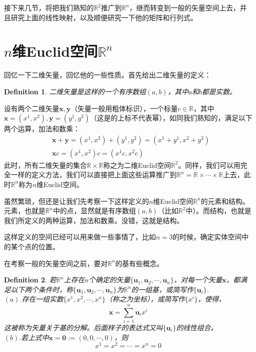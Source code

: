 \documentclass[11pt,a4paper,openany]{book}%
\theoremstyle{plain}%
\newtheorem{defi}{Definition}[chapter]%
\begin{document}
接下来几节，将把我们熟知的$\mathbb{R}^{2}$推广到$\mathbb{R}^{n}$，继而转变到一般的矢量空间上去，并且研究上面的线性映射，以及顺便研究一下他的矩阵和行列式。
\section{$n$维Euclid空间$\mathbb{R}^{n}$}
回忆一下二维矢量，回忆他的一些性质。首先给出二维矢量的定义：
\begin{defi}
二维矢量是这样的一个有序数组$(a,b)$，其中$a$和$b$都是实数。
\end{defi}

设有两个二维矢量$\bm{x},\bm{y}$（矢量一般用粗体标识），一个标量$c \in \mathbb{R}$，其中$\bm{x}=(x^{1},x^{2}),\bm{y}=(y^{1},y^{2})$（这是的上标不代表幂），如同我们熟知的，满足以下两个运算，加法和数乘：
\begin{equation*}
\begin{split}
&\bm{x}+\bm{y}=(x^{1},x^{2})+(y^{1},y^{2})=(x^{1}+y^{1},x^{2}+y^{2})\\
&\bm{x}c=(x^{1},x^{2})c=(x^{1}c,x^{2}c)
\end{split}
\end{equation*}
此时，所有二维矢量的集合$\mathbb{R}\times \mathbb{R}$称之为二维{\rm Euclid}空间$\mathbb{R}^{2}$。同样，我们可以用完全一样的定义方法，我们可以直接把上面这些运算推广到$\mathbb{R}^{n}=\mathbb{R}\times \cdots \times \mathbb{R}$上去，此时$\mathbb{R}^{n}$称为$n$维{\rm Euclid}空间。

虽然繁琐，但还是让我们先考察一下这样定义的$n$维Euclid空间$\mathbb{R}^{n}$的元素和结构。元素，也就是$\mathbb{R}^{n}$中的点，显然就是有序数组$(a,b)$（比如$\mathbb{R}^{2}$中）。而结构，也就是我们所定义的两种运算，加法和数乘。没错，这就是结构。

这样定义的空间已经可以用来做一些事情了，比如$n=3$的时候，确定实体空间中的某个点的位置。

在考察一般的矢量空间之前，要对$\mathbb{R}^{n}$的基有些概念。
\begin{defi}
\label{1}
若$\mathbb{R}^{n}$上存在$n$个确定的矢量$\{\bm{u}_{1},\bm{u}_{2},\cdots,\bm{u}_{n}\}$，对每一个矢量$\bm{x}$，都满足以下两个条件时，称$\{\bm{u}_{1},\bm{u}_{2},\cdots,\bm{u}_{n}\}$为$\mathbb{R}^{n}$的一组基，或简写作$\{\bm{u}_{i}\}$.\\
$(a)$.存在一组实数$\{x^{1},x^{2},\cdots,x^{n}\}$（称之为{\kaishu 坐标}），或简写作$\{x^{i}\}$，使得，
\[
\bm{x}=\sum_{i=1}^{n}\bm{u}_{i}x^{i}
\]
这被称为矢量关于基的分解。后面样子的表达式又叫$\{\bm{u}_{i}\}$的线性组合。\\
$(b)$.若上式中$\bm{x}=\bm{0}:=(0,0,\cdots,0)$，则
\[
x^{1}=x^{2}=\cdots=x^{n}=0
\]
\end{defi}
\end{document}

